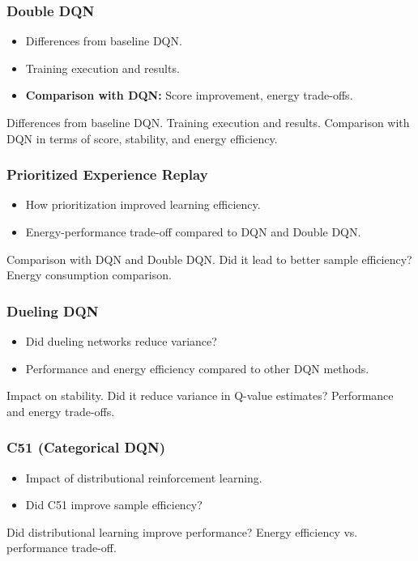 \subsubsection{Double DQN}
\label{subsubsec:ddqn}
\begin{itemize}
	\item Differences from baseline DQN.
	\item Training execution and results.
	\item \textbf{Comparison with DQN:} Score improvement, energy trade-offs.
\end{itemize}
Differences from baseline DQN.
Training execution and results.
Comparison with DQN in terms of score, stability, and energy efficiency.


\subsubsection{Prioritized Experience Replay}
\begin{itemize}
	\item How prioritization improved learning efficiency.
	\item Energy-performance trade-off compared to DQN and Double DQN.
\end{itemize}
Comparison with DQN and Double DQN.
Did it lead to better sample efficiency?
Energy consumption comparison.


\subsubsection{Dueling DQN}
\begin{itemize}
	\item Did dueling networks reduce variance?
	\item Performance and energy efficiency compared to other DQN methods.
\end{itemize}
Impact on stability.
Did it reduce variance in Q-value estimates?
Performance and energy trade-offs.


\subsubsection{C51 (Categorical DQN)}
\begin{itemize}
	\item Impact of distributional reinforcement learning.
	\item Did C51 improve sample efficiency?
\end{itemize}
Did distributional learning improve performance?
Energy efficiency vs. performance trade-off.


